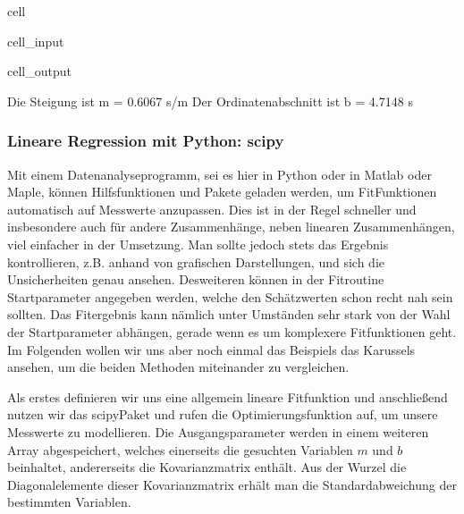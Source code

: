 \documentclass[letterpaper,10pt,english]{jupyterBook}
\begin{document}
\begin{sphinxuseclass}{cell}
\begin{sphinxVerbatimInput}
\begin{sphinxuseclass}{cell_input}
\end{sphinxuseclass}\end{sphinxVerbatimInput}
\begin{sphinxVerbatimOutput}

\begin{sphinxuseclass}{cell_output}
\begin{sphinxVerbatim}[commandchars=\\\{\}]
Die Steigung ist 		 m = 0.6067 s/m
Der Ordinatenabschnitt ist 	 b = 4.7148 s
\end{sphinxVerbatim}

\noindent{}

\end{sphinxuseclass}\end{sphinxVerbatimOutput}

\end{sphinxuseclass}

\subsubsection{Lineare Regression mit Python: scipy }
\label{\detokenize{content/1_Kurvenanpassung:lineare-regression-mit-python-scipy-a-id-subsec-scipy-linreg-a}}
\sphinxAtStartPar
Mit einem Datenanalyseprogramm, sei es hier in Python oder in Matlab oder Maple, können Hilfsfunktionen und Pakete geladen werden, um Fit\sphinxhyphen{}Funktionen automatisch auf Messwerte anzupassen. Dies ist in der Regel schneller und insbesondere auch für andere Zusammenhänge, neben linearen Zusammenhängen, viel einfacher in der Umsetzung. Man sollte jedoch stets das Ergebnis kontrollieren, z.B. anhand von grafischen Darstellungen, und sich die Unsicherheiten genau ansehen. Desweiteren können in der Fitroutine Startparameter angegeben werden, welche den Schätzwerten schon recht nah sein sollten. Das Fitergebnis kann nämlich unter Umständen sehr stark von der Wahl der Startparameter abhängen, gerade wenn es um komplexere Fitfunktionen geht. Im Folgenden wollen wir uns aber noch einmal das Beispiels das Karussels ansehen, um die beiden Methoden miteinander zu vergleichen.

\sphinxAtStartPar
Als erstes definieren wir uns eine allgemein lineare Fitfunktion und anschließend nutzen wir das scipy\sphinxhyphen{}Paket und rufen die Optimierungsfunktion auf, um unsere Messwerte zu modellieren. Die Ausgangsparameter werden in einem weiteren Array abgespeichert, welches einerseits die gesuchten Variablen \(m\) und \(b\) beinhaltet, andererseits die Kovarianzmatrix enthält. Aus der Wurzel die Diagonalelemente dieser Kovarianzmatrix erhält man die Standardabweichung der bestimmten Variablen.
\end{document}
